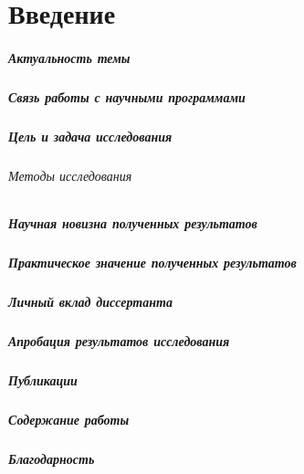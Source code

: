 \chapter*{Введение}

\paragraph{Актуальность темы}

\paragraph{Связь работы с научными программами}

\paragraph{Цель и задача исследования}

\subparagraph{Методы исследования}

\paragraph{Научная новизна полученных результатов}

\paragraph{Практическое значение полученных результатов}

\paragraph{Личный вклад диссертанта}

\paragraph{Апробация результатов исследования}

\paragraph{Публикации}

\paragraph{Содержание работы}

\paragraph{Благодарность}

